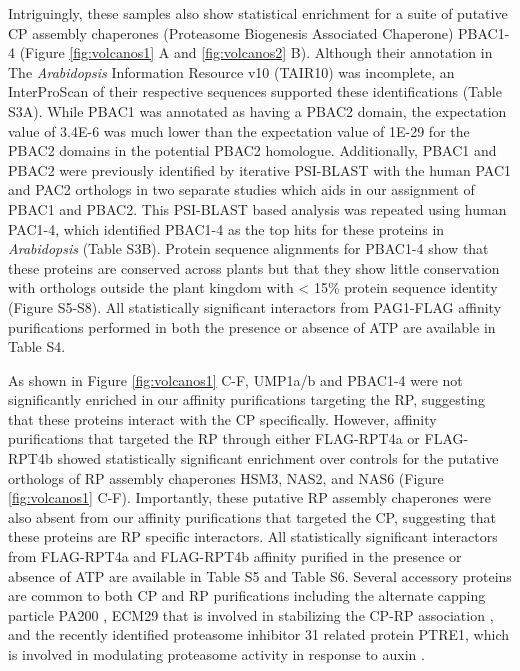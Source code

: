 Intriguingly, these samples also show statistical enrichment for a suite of putative CP assembly chaperones (Proteasome Biogenesis Associated Chaperone) PBAC1-4 (Figure \ref{fig:volcanos1} A and \ref{fig:volcanos2} B). Although their annotation in The \textit{Arabidopsis} Information Resource v10 (TAIR10) was incomplete, an InterProScan of their respective sequences supported these identifications (Table S3A). While PBAC1 was annotated as having a PBAC2 domain, the expectation value of 3.4E-6 was much lower than the expectation value of 1E-29 for the PBAC2 domains in the potential PBAC2 homologue. Additionally, PBAC1 and PBAC2 were previously identified by iterative PSI-BLAST with the human PAC1 and PAC2 orthologs in two separate studies \citep{kusmierczyk11, le07} which aids in our assignment of PBAC1 and PBAC2. This PSI-BLAST based analysis was repeated using human PAC1-4, which identified PBAC1-4 as the top hits for these proteins in \textit{Arabidopsis} (Table S3B). Protein sequence alignments for PBAC1-4 show that these proteins are conserved across plants but that they show little conservation with orthologs outside the plant kingdom with < 15\% protein sequence identity (Figure S5-S8).  All statistically significant interactors from PAG1-FLAG affinity purifications performed in both the presence or absence of ATP are available in Table S4.

As shown in Figure \ref{fig:volcanos1} C-F, UMP1a/b and PBAC1-4 were not significantly enriched in our affinity purifications targeting the RP, suggesting that these proteins interact with the CP specifically. However, affinity purifications that targeted the RP through either FLAG-RPT4a or FLAG-RPT4b showed statistically significant enrichment over controls for the putative orthologs of RP assembly chaperones HSM3, NAS2, and NAS6 (Figure \ref{fig:volcanos1} C-F). Importantly, these putative RP assembly chaperones were also absent from our affinity purifications that targeted the CP, suggesting that these proteins are RP specific interactors. All statistically significant interactors from FLAG-RPT4a and FLAG-RPT4b affinity purified in the presence or absence of ATP are available in Table S5 and Table S6. Several accessory proteins are common to both CP and RP purifications including the alternate capping particle PA200 \citep{book10}, ECM29 that is involved in stabilizing the CP-RP association \citep{lehmann10}, and the recently identified proteasome inhibitor 31 related protein PTRE1, which is involved in modulating proteasome activity in response to auxin \citep{yang16}. 

